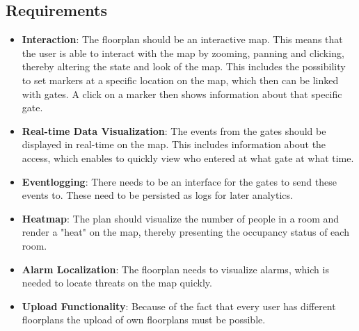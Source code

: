 \subsection{Requirements}

\begin{itemize}
	\item \textbf{Interaction}:
	The floorplan should be an interactive map. This means that the user is able to interact with the map by zooming, panning and clicking, thereby altering the state and look of the map. This includes the possibility to set markers at a specific location on the map, which then can be linked with gates. A click on a marker then shows information about that specific gate.
	\item \textbf{Real-time Data Visualization}:
	 The events from the gates should be displayed in real-time on the map. This includes information about the access, which enables to quickly view who entered at what gate at what time.
	\item \textbf{Eventlogging}:
	There needs to be an interface for the gates to send these events to. These need to be persisted as logs for later analytics.
	\item \textbf{Heatmap}:
	The plan should visualize the number of people in a room and render a "heat" on the map, thereby presenting the occupancy status of each room.
	\item \textbf{Alarm Localization}:
	The floorplan needs to visualize alarms, which is needed to locate threats on the map quickly.
	\item \textbf{Upload Functionality}:
	Because of the fact that every user has different floorplans the upload of own floorplans must be possible.
\end{itemize}

\clearpage



